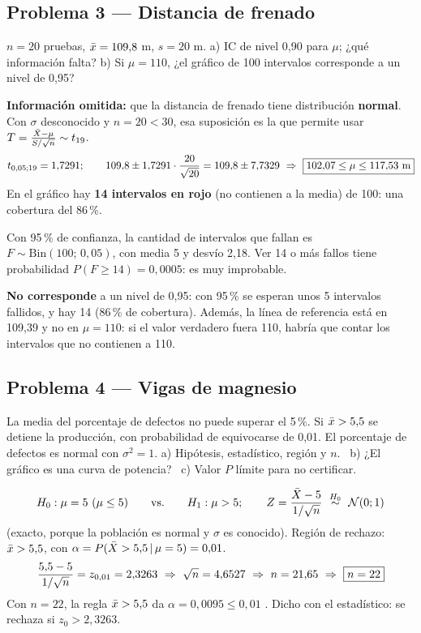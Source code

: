 \subsection{Problema 3 --- Distancia de frenado}
\begin{enun}
$n=20$ pruebas, $\bar{x}=109{,}8$ m, $s=20$ m. a) IC de nivel 0,90 para $\mu$; ¿qué información falta? b) Si $\mu=110$, ¿el gráfico de 100 intervalos corresponde a un nivel de 0,95?
\end{enun}
\textbf{Información omitida:} que la distancia de frenado tiene distribución \textbf{normal}. Con $\sigma$ desconocido y $n=20<30$, esa suposición es la que permite usar $T=\frac{\bar{X}-\mu}{S/\sqrt n}\sim t_{19}$.
\[
t_{0,05;19}=1{,}7291;\qquad109{,}8\pm1{,}7291\cdot\frac{20}{\sqrt{20}}=109{,}8\pm7{,}7329\ \Rightarrow\ \res{102{,}07\le\mu\le117{,}53\ \text{m}}
\]
 En el gráfico hay \textbf{14 intervalos en rojo} (no contienen a la media) de 100: una cobertura del 86\,\%.

 Con 95\,\% de confianza, la cantidad de intervalos que fallan es $F\sim\mathrm{Bin}(100;\,0{,}05)$, con media 5 y desvío 2,18. Ver 14 o más fallos tiene probabilidad $P(F\ge14)=0{,}0005$: es muy improbable.
\begin{resp}
\textbf{No corresponde} a un nivel de 0,95: con 95\,\% se esperan unos 5 intervalos fallidos, y hay 14 (86\,\% de cobertura). Además, la línea de referencia está en 109,39 y no en $\mu=110$: si el valor verdadero fuera 110, habría que contar los intervalos que no contienen a 110.
\end{resp}

\subsection{Problema 4 --- Vigas de magnesio}
\begin{enun}
La media del porcentaje de defectos no puede superar el 5\,\%. Si $\bar{x}>5{,}5$ se detiene la producción, con probabilidad de equivocarse de 0,01. El porcentaje de defectos es normal con $\sigma^2=1$.
a) Hipótesis, estadístico, región y $n$. \ b) ¿El gráfico es una curva de potencia? \ c) Valor $P$ límite para no certificar.
\end{enun}
\[
H_0:\mu=5\ (\mu\le5)\qquad\text{vs.}\qquad H_1:\mu>5;\qquad Z=\frac{\Xb-5}{1/\sqrt n}\ \overset{H_0}{\sim}\ \Nor(0;1)
\]
(exacto, porque la población es normal y $\sigma$ es conocido). Región de rechazo: $\bar{x}>5{,}5$, con $\alpha=P(\bar{X}>5{,}5\,|\,\mu=5)=0{,}01$.
\[
\frac{5{,}5-5}{1/\sqrt n}=z_{0,01}=2{,}3263\ \Rightarrow\ \sqrt n=4{,}6527\ \Rightarrow\ n=21{,}65\ \Rightarrow\ \res{n=22}
\]
Con $n=22$, la regla $\bar{x}>5{,}5$ da $\alpha=0{,}0095\le0{,}01$ \checkmark. Dicho con el estadístico: se rechaza si $z_0>2{,}3263$.

